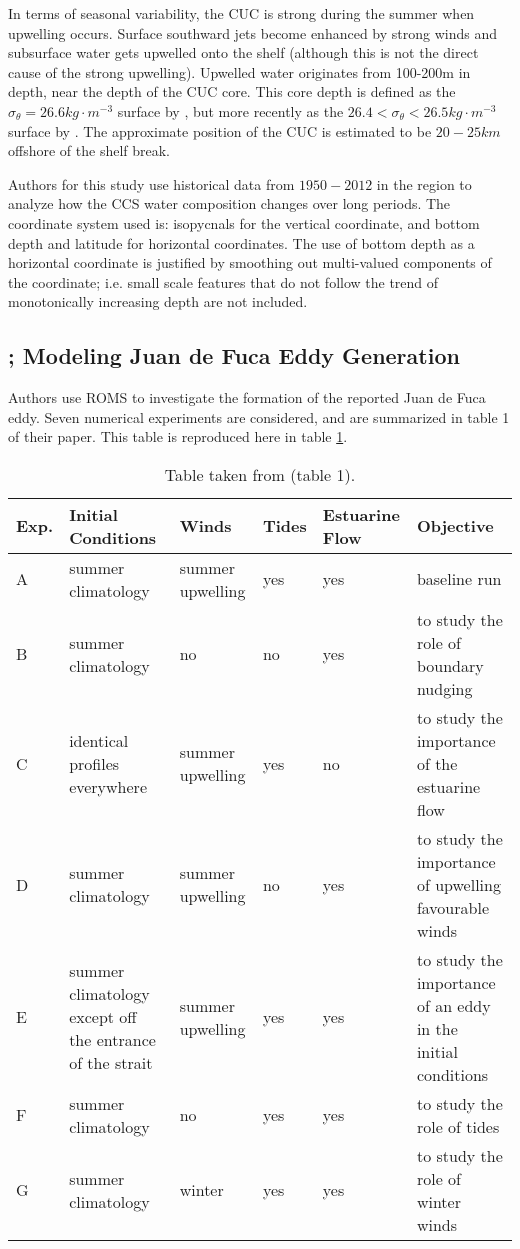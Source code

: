 \documentclass[12pt]{extreport}
\begin{document}
In terms of seasonal variability, the CUC is strong during the summer when upwelling occurs. Surface southward jets become enhanced by strong winds and subsurface water gets upwelled onto the shelf (although this is not the direct cause of the strong upwelling). Upwelled water originates from 100-200m in depth, near the depth of the CUC core. This core depth is defined as the $\sigma_\theta =26.6 kg\cdot m^{-3}$ surface by \cite{lynn1987california}, but more recently as the $26.4 < \sigma_\theta < 26.5 kg \cdot m^{-3}$ surface by \cite{gay2009mean}. The approximate position of the CUC is estimated to be $20-25km$ offshore of the shelf break. 

Authors for this study use historical data from $1950-2012$ in the region to analyze how the CCS water composition changes over long periods. The coordinate system used is: isopycnals for the vertical coordinate, and bottom depth and latitude for horizontal coordinates. The use of bottom depth as a horizontal coordinate is justified by smoothing out multi-valued components of the coordinate; i.e. small scale features that do not follow the trend of monotonically increasing depth are not included. 

\subsection{\cite{foreman2008modeling}; Modeling Juan de Fuca Eddy Generation}

Authors use ROMS to investigate the formation of the reported Juan de Fuca eddy. Seven numerical experiments are considered, and are summarized in table 1 of their paper. This table is reproduced here in table \ref{tab:foreman}.

\begin{table}[h]
\centering
\begin{tabular}{| p{} | p{} | p{} | p{} | p{} | p{} |}
\hline 
Exp. & Initial Conditions & Winds & Tides & Estuarine Flow & Objective \\
\hline
A & summer climatology & summer upwelling & yes & yes & baseline run \\
B & summer climatology & no & no  & yes & to study the role of boundary nudging \\
C & identical profiles everywhere & summer upwelling & yes & no & to study the importance of the estuarine flow \\
D & summer climatology & summer upwelling & no  & yes & to study the importance of upwelling favourable winds \\
E & summer climatology except off the entrance of the strait & summer upwelling  & yes  & yes & to study the importance of an eddy in the initial conditions \\
F & summer climatology & no & yes & yes & to study the role of tides\\
G & summer climatology & winter & yes & yes & to study the role of winter winds \\
\hline
\end{tabular}
\caption{Table taken from \cite{foreman2008modeling} (table 1).}
\label{tab:foreman}
\end{table}
\end{document}
